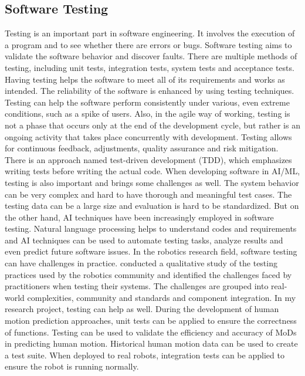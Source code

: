 \documentclass[11pt]{article}
\begin{document}
\subsection{Software Testing}
Testing is an important part in software engineering. It involves the execution of a program and to see whether there are errors or bugs. Software testing aims to validate the software behavior and discover faults. There are multiple methods of testing, including unit tests, integration tests, system tests and acceptance tests. Having testing helps the software to meet all of its requirements and works as intended. The reliability of the software is enhanced by using testing techniques. Testing can help the software perform consistently under various, even extreme conditions, such as a spike of users. Also, in the agile way of working, testing is not a phase that occurs only at the end of the development cycle, but rather is an ongoing activity that takes place concurrently with development. Testing allows for continuous feedback, adjustments, quality assurance and risk mitigation. There is an approach named test-driven development (TDD), which emphasizes writing tests before writing the actual code. When developing software in AI/ML, testing is also important and brings some challenges as well. The system behavior can be very complex and hard to have thorough and meaningful test cases.  The testing data can be a large size and evaluation is hard to be standardized. But on the other hand,  AI techniques have been increasingly employed in software testing. Natural language processing helps to understand codes and requirements and AI techniques can be used to automate testing tasks, analyze results and even predict future software issues. In the robotics research field, software testing can have challenges in practice. \cite{testing} conducted a qualitative study of the testing practices used by the robotics community and identified the challenges faced by practitioners when testing their systems. The challenges are grouped into real-world complexities, community and standards and component integration. In my research project, testing can help as well. During the development of human motion prediction approaches, unit tests can be applied to ensure the correctness of functions. Testing can be used to validate the efficiency and accuracy of MoDs in predicting human motion. Historical human motion data can be used to create a test suite. When deployed to real robots, integration tests can be applied to ensure the robot is running normally. 
\end{document}
